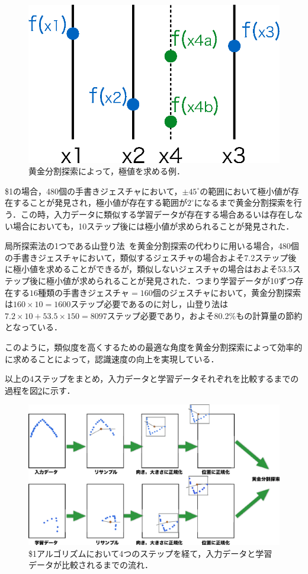 \begin{figure} [!h]
\centering
\includegraphics [width=0.4\columnwidth]{img/golden.eps}
\caption{黄金分割探索によって，極値を求める例．}
\label{fig:golden}
\end{figure}

\$1の場合，480個の手書きジェスチャにおいて，$\pm45^\circ$の範囲において極小値が存在することが発見され，極小値が存在する範囲が$2^\circ$になるまで黄金分割探索を行う．この時，入力データに類似する学習データが存在する場合あるいは存在しない場合においても，10ステップ後には極小値が求められることが発見された．

局所探索法の1つである山登り法~\cite{Park:2009:SFA:1464526.1465112,Department94prototypeand}を黄金分割探索の代わりに用いる場合，480個の手書きジェスチャにおいて，類似するジェスチャの場合およそ7.2ステップ後に極小値を求めることができるが，類似しないジェスチャの場合はおよそ53.5ステップ後に極小値が求められることが発見された．つまり学習データが10ずつ存在する$16種類の手書きジェスチャ=160$個のジェスチャにおいて，黄金分割探索は$160\times10=1600$ステップ必要であるのに対し，山登り法は$7.2\times10 + 53.5\times150=8097$ステップ必要であり，およそ80.2\%もの計算量の節約となっている．

このように，類似度を高くするための最適な角度を黄金分割探索によって効率的に求めることによって，認識速度の向上を実現している．

以上の4ステップをまとめ，入力データと学習データそれぞれを比較するまでの過程を図\ref{fig:onedoller_flow}に示す．
\begin{figure} [!h]
\centering
\includegraphics [width=0.9\columnwidth]{img/onedoller_flow.eps}
\caption{\$1アルゴリズムにおいて4つのステップを経て，入力データと学習データが比較されるまでの流れ．}
\label{fig:onedoller_flow}
\end{figure}

